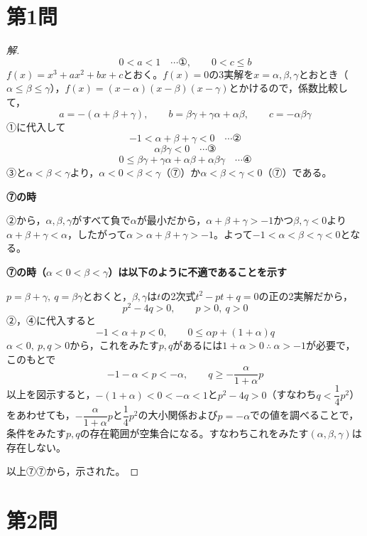\documentclass[../main.tex]{subfiles}
\begin{document}
\section*{第1問}

\begin{proof}[解]
  \[
    0<a<1 \quad\cdots\text{①}, \qquad 0<c\le b
  \]
  $f(x)=x^3+ax^2+bx+c$とおく。$f(x)=0$の3実解を$x=\alpha,\beta,\gamma$とおとき（$\alpha\le\beta\le\gamma$），$f(x)=(x-\alpha)(x-\beta)(x-\gamma)$とかけるので，係数比較して，
  \[
    a=-(\alpha+\beta+\gamma), \qquad b=\beta\gamma+\gamma\alpha+\alpha\beta, \qquad c=-\alpha\beta\gamma
  \]
  ①に代入して
  \[
    -1<\alpha+\beta+\gamma<0 \quad\cdots\text{②}
  \]
  \[
    \alpha\beta\gamma<0 \quad\cdots\text{③}
  \]
  \[
    0\le\beta\gamma+\gamma\alpha+\alpha\beta+\alpha\beta\gamma \quad\cdots\text{④}
  \]
  ③と$\alpha<\beta<\gamma$より，$\alpha<0<\beta<\gamma$（⑦）か$\alpha<\beta<\gamma<0$（⑦）である。

  \textbf{⑦の時}

  ②から，$\alpha,\beta,\gamma$がすべて負で$\alpha$が最小だから，$\alpha+\beta+\gamma>-1$かつ$\beta,\gamma<0$より$\alpha+\beta+\gamma<\alpha$，したがって$\alpha>\alpha+\beta+\gamma>-1$。よって$-1<\alpha<\beta<\gamma<0$となる。

  \textbf{⑦の時（$\alpha<0<\beta<\gamma$）は以下のように不適であることを示す}

  $p=\beta+\gamma,\ q=\beta\gamma$とおくと，$\beta,\gamma$は$t$の2次式$t^2-pt+q=0$の正の2実解だから，
  \[
    p^2-4q>0, \qquad p>0,\ q>0
  \]
  ②，④に代入すると
  \[
    -1<\alpha+p<0, \qquad 0\le\alpha p+(1+\alpha)q
  \]
  $\alpha<0,\ p,q>0$から，これをみたす$p,q$があるには$1+\alpha>0\ \therefore\ \alpha>-1$が必要で，このもとで
  \[
    -1-\alpha<p<-\alpha, \qquad q\ge-\frac{\alpha}{1+\alpha}p
  \]
  以上を図示すると，$-(1+\alpha)<0<-\alpha<1$と$p^2-4q>0$（すなわち$q<\dfrac14p^2$）をあわせても，$-\dfrac{\alpha}{1+\alpha}p$と$\dfrac14p^2$の大小関係および$p=-\alpha$での値を調べることで，条件をみたす$p,q$の存在範囲が空集合になる。すなわちこれをみたす$(\alpha,\beta,\gamma)$は存在しない。

  以上⑦⑦から，示された。
\end{proof}

\newpage

\section*{第2問}

\end{document}
